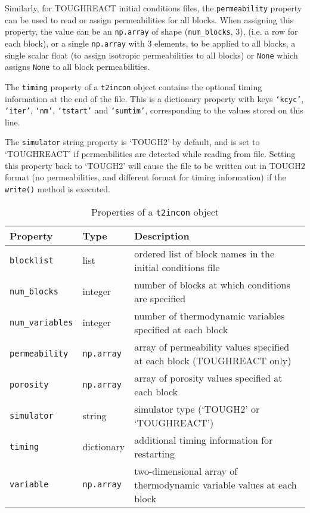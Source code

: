 Similarly, for TOUGHREACT initial conditions files, the \texttt{permeability} property can be used to read or assign permeabilities for all blocks.  When assigning this property, the value can be an \texttt{np.array} of shape (\texttt{num\_blocks}, 3), (i.e. a row for each block), or a single \texttt{np.array} with 3 elements, to be applied to all blocks, a single scalar float (to assign isotropic permeabilities to all blocks) or \texttt{None} which assigns \texttt{None} to all block permeabilities.

The \texttt{timing} property of a \texttt{t2incon} object contains the optional timing information at the end of the file.  This is a dictionary property with keys \texttt{`kcyc'}, \texttt{`iter'}, \texttt{`nm'}, \texttt{`tstart'} and \texttt{`sumtim'}, corresponding to the values stored on this line.

The \texttt{simulator} string property is `TOUGH2' by default, and is set to `TOUGHREACT' if permeabilities are detected while reading from file.  Setting this property back to `TOUGH2' will cause the file to be written out in TOUGH2 format (no permeabilities, and different format for timing information) if the \texttt{write()} method is executed.

\begin{table}
  \begin{center}
    \begin{tabular}{|l|l|p{75mm}|}
      \hline
      \textbf{Property} & \textbf{Type} & \textbf{Description}\\
      \hline
      \texttt{blocklist} & list & ordered list of block names in the initial conditions file\\
      \texttt{num\_blocks} & integer & number of blocks at which conditions are specified \\
      \texttt{num\_variables} & integer & number of thermodynamic variables specified at each block\\
      \texttt{permeability} & \texttt{np.array} & array of permeability values specified at each block (TOUGHREACT only)\\
      \texttt{porosity} & \texttt{np.array} & array of porosity values specified at each block\\
      \texttt{simulator} & string & simulator type (`TOUGH2' or `TOUGHREACT')\\
      \texttt{timing} & dictionary & additional timing information for restarting\\
      \texttt{variable} & \texttt{np.array} & two-dimensional array of thermodynamic variable values at each block\\
      \hline
    \end{tabular}
    \caption{Properties of a \texttt{t2incon} object}
    \label{tb:t2incon_properties}
  \end{center}
\end{table}

